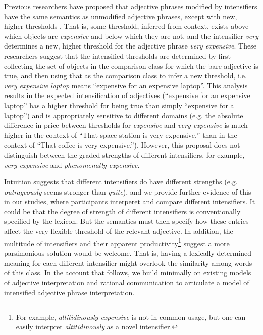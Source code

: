 \documentclass[10pt,letterpaper]{article}
\newcommand{\w}[1]{\emph{#1}}
\begin{document}
Previous researchers have proposed that adjective phrases modified by intensifiers have the same semantics as unmodified adjective phrases, except with new, higher thresholds \cite{kennedy_scale_2005, klein_semantics_1980, wheeler_attributives_1972}.
That is, some threshold, inferred from context, exists above which objects are \w{expensive} and below which they are not, and the intensifier \w{very} determines a new, higher threshold for the adjective phrase \w{very expensive}.
These researchers suggest that the intensified thresholds are determined by first collecting the set of objects in the comparison class for which the bare adjective is true, and then using that as the comparison class to infer a new threshold, i.e. \w{very expensive laptop} means ``expensive for an expensive laptop''.
This analysis results in the expected intensification of adjectives (``expensive for an expensive laptop'' has a higher threshold for being true than simply ``expensive for a laptop'') and is appropriately sensitive to different domains (e.g. the absolute difference in price between thresholds for \w{expensive} and \w{very expensive} is much higher in the context of ``That space station is very expensive,'' than in the context of ``That coffee is very expensive.'').
However, this proposal does not distinguish between the graded strengths of different intensifiers, for example, \w{very expensive} and \w{phenomenally expensive}.

Intuition suggests that different intensifiers do have different strengths (e.g. \w{outrageously} seems stronger than \w{quite}), and we provide further evidence of this in our studies, where participants interperet and compare different intensifiers.
It could be that the degree of strength of different intensifiers is conventionally specified by the lexicon. But the semantics must then specify how these entries affect the very flexible threshold of the relevant adjective.
In addition, the multitude of intensifiers \cite{bolinger_degree_1972} and their apparent productivity\footnote{For example, \w{altitidinously expensive} is not in common usage, but one can easily interpret \w{altitidinously} as a novel intensifier.}
suggest a more parsimonious solution would be welcome. 
That is, having a lexically determined meaning for each different intensifier might overlook the similarity among words of this class.
In the account that follows, we build minimally on existing models of adjective interpretation and rational communication to articulate a model of intensified adjective phrase interpretation.
\end{document}
